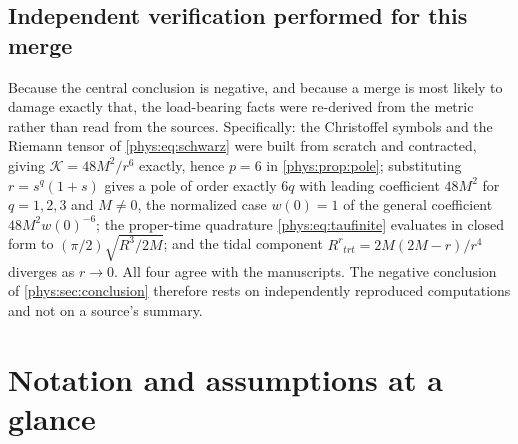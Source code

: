 \documentclass[11pt,letterpaper]{article}
\numberwithin{equation}{section}
\theoremstyle{definition}
\theoremstyle{remark}
\newcommand{\Kret}{\mathcal K}
\begin{document}
\subsection{Independent verification performed for this merge}
\label{phys:app:sub:independent}

Because the central conclusion is negative, and because a merge is most likely
to damage exactly that, the load-bearing facts were re-derived from the metric
rather than read from the sources. Specifically: the Christoffel symbols and
the Riemann tensor of \eqref{phys:eq:schwarz} were built from scratch and
contracted, giving $\Kret=48M^{2}/r^{6}$ exactly, hence $p=6$ in
\cref{phys:prop:pole}; substituting $r=s^{q}(1+s)$ gives a pole of order
exactly $6q$ with leading coefficient $48M^{2}$ for $q=1,2,3$ and $M\ne0$,
the normalized case $w(0)=1$ of the general coefficient
$48M^{2}w(0)^{-6}$;
the proper-time quadrature \eqref{phys:eq:taufinite} evaluates in closed form
to $(\pi/2)\sqrt{R^{3}/2M}$; and the tidal component
$R^{r}{}_{trt}=2M(2M-r)/r^{4}$ diverges as $r\to0$. All four agree with the
manuscripts. The negative conclusion of \cref{phys:sec:conclusion} therefore
rests on independently reproduced computations and not on a source's summary.

\section{Notation and assumptions at a glance}
\label{phys:app:notation}
\end{document}
